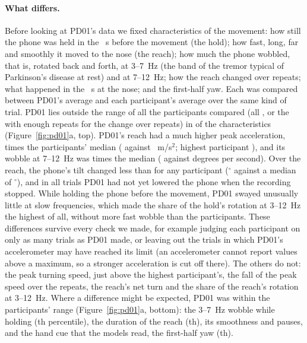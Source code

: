 \paragraph{What differs.} Before looking at PD01's data we fixed  characteristics of the movement:
how still the phone was held in the ~s before the movement (the hold); how fast, long, far and
smoothly it moved to the nose (the reach); how much the phone wobbled, that is, rotated back and forth, at 3--7~Hz (the
band of the tremor typical of Parkinson's disease at rest) and at 7--12~Hz; how the reach changed over repeats; what
happened in the ~s at the nose; and the first-half yaw. Each was compared between PD01's average and
each participant's average over the same kind of trial. PD01 lies outside the range of all the participants compared
(all , or the  with enough repeats for the change over repeats) in
 of the  characteristics (Figure~\ref{fig:pd01}a, top). PD01's reach had a
much higher peak acceleration,  times the participants' median ( against
~m/s$^2$; highest participant ), and its wobble at 7--12~Hz was
 times the median ( against  degrees per
second). Over the reach, the phone's tilt changed less than for any participant ($^\circ$ against
a median of $^\circ$), and in all  trials PD01 had not yet lowered the
phone when the recording stopped. While holding the phone before the movement, PD01 swayed unusually little at slow
frequencies, which made the share of the hold's rotation at 3--12~Hz the highest of all, without more fast wobble than
the participants. These  differences survive every check we made, for example judging each
participant on only as many trials as PD01 made, or leaving out the trials in which PD01's accelerometer may have
reached its limit (an accelerometer cannot report values above a maximum, so a stronger acceleration is cut off there).
The others do not: the peak turning speed, just above the highest participant's, the fall of the peak speed over the
repeats, the reach's net turn and the share of the reach's rotation at 3--12~Hz. Where a difference might be expected,
PD01 was within the participants' range (Figure~\ref{fig:pd01}a, bottom): the 3--7~Hz wobble while holding
(th percentile), the duration of the reach (th), its smoothness and pauses,
and the hand cue that the models read, the first-half yaw (th).

